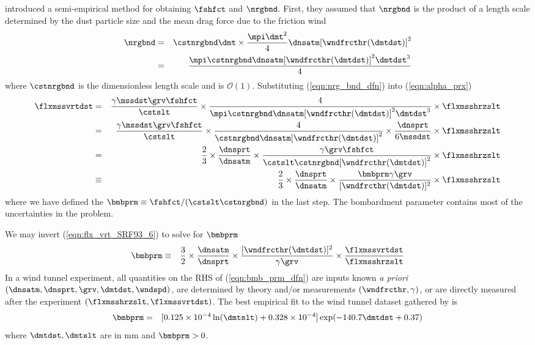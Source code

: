 \documentclass[12pt,twoside]{book}
\begin{document}
\cite{SRL96} introduced a semi-empirical method for obtaining
$\fshfct$ and $\nrgbnd$.
First, they assumed that $\nrgbnd$ is the product of a length scale
determined by the dust particle size and the mean drag force due to
the friction wind  
\begin{eqnarray}
\nrgbnd & = & \cstnrgbnd \dmt \times \frac{\mpi \dmt^{2}}{4} 
\dnsatm [ \wndfrcthr ( \dmtdst ) ]^{2} \nonumber \\
& = & \frac{\mpi \cstnrgbnd \dnsatm [ \wndfrcthr ( \dmtdst ) ]^{2} \dmtdst^{3}}{4}
\label{eqn:nrg_bnd_dfn}
\end{eqnarray}
where $\cstnrgbnd$ is the dimensionless length scale and is
$\mathcal{O}(1)$. 
Substituting (\ref{eqn:nrg_bnd_dfn}) into (\ref{eqn:alpha_prx}) 
\begin{eqnarray}
\flxmssvrtdst 
& = & 
\frac{\gamma \mssdst \grv \fshfct}{\cstslt } \times 
\frac{4}{\mpi \cstnrgbnd \dnsatm [ \wndfrcthr ( \dmtdst ) ]^{2} \dmtdst^{3} } \times
\flxmsshrzslt
\nonumber \\
& = & 
\frac{\gamma \mssdst \grv \fshfct}{\cstslt } \times 
\frac{4}{\cstnrgbnd \dnsatm [ \wndfrcthr ( \dmtdst ) ]^{2} } \times 
\frac{\dnsprt}{6 \mssdst } \times
\flxmsshrzslt
\nonumber \\
& = & 
\frac{2}{3} \times 
\frac{\dnsprt}{\dnsatm } \times
\frac{\gamma \grv \fshfct}{\cstslt \cstnrgbnd [ \wndfrcthr ( \dmtdst ) ]^{2} } \times 
\flxmsshrzslt
\nonumber \\
& \equiv & 
\frac{2}{3} \times 
\frac{\dnsprt}{\dnsatm } \times
\frac{\bmbprm \gamma \grv}{[ \wndfrcthr ( \dmtdst ) ]^{2} } \times 
\flxmsshrzslt
\label{eqn:flx_vrt_SRF93_6}
\end{eqnarray}
where we have defined the 
$\bmbprm \equiv \fshfct / ( \cstslt \cstnrgbnd )$ in the last step.
The bombardment parameter contains most of the uncertainties in the
problem. 

We may invert (\ref{eqn:flx_vrt_SRF93_6}) to solve for $\bmbprm$
\begin{eqnarray}
\bmbprm
& \equiv & 
\frac{3}{2} \times 
\frac{\dnsatm}{\dnsprt } \times
\frac{[ \wndfrcthr ( \dmtdst ) ]^{2}}{\gamma \grv } \times 
\frac{\flxmssvrtdst}{\flxmsshrzslt }
\label{eqn:bmb_prm_dfn}
\end{eqnarray}
In a wind tunnel experiment, all quantities on the RHS of
(\ref{eqn:bmb_prm_dfn}) are inputs known \textit{a priori} $(\dnsatm,
\dnsprt, \grv, \dmtdst, \wndspd)$, are determined by theory and/or
measurements $(\wndfrcthr, \gamma)$, or are directly measured after
the experiment $(\flxmsshrzslt,\flxmssvrtdst)$. 
The best empirical fit to the wind tunnel dataset gathered by
\cite{SRF93} is 
\begin{eqnarray}
\bmbprm & = & 
[ 0.125 \times 10^{-4} \ln ( \dmtslt ) +
0.328 \times 10^{-4} ] 
\exp ( -140.7 \dmtdst + 0.37 )
\label{eqn:bmb_prm_obs}
\end{eqnarray}
where $\dmtdst, \dmtslt$ are in mm and $\bmbprm > 0$.
\end{document}
